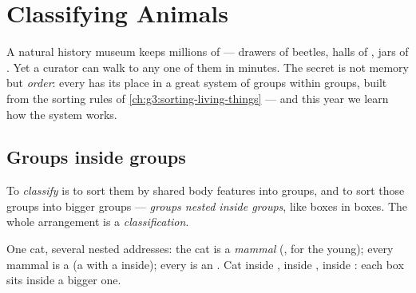\chapter{Classifying Animals}\label{ch:g4:classifying-animals}

A natural history museum keeps millions of  --- drawers of
beetles, halls of , jars of . Yet a curator can walk
to any one of them in minutes. The secret is not memory but
\emph{order}: every  has its place in a great system of
groups within groups, built from the sorting rules of
\cref{ch:g3:sorting-living-things} --- and this year we learn how
the system works.

\section{Groups inside groups}

\begin{definition}[Classification]\label{def:g4:classifying-animals:classification}
To \emph{classify}  is to sort them
by shared body features into groups, and to sort those groups
into bigger groups --- \emph{groups nested inside
groups}, like boxes in boxes. The whole
arrangement is a \emph{classification}.
\end{definition}

\begin{example}\label{ex:g4:classifying-animals:cat}
One cat, several nested addresses: the cat is a \emph{mammal}
(,  for the young); every mammal is a
\emph{} (a  with a  inside); every
 is an \emph{}. Cat inside , 
inside ,  inside : each box sits
inside a bigger one.
\end{example}

